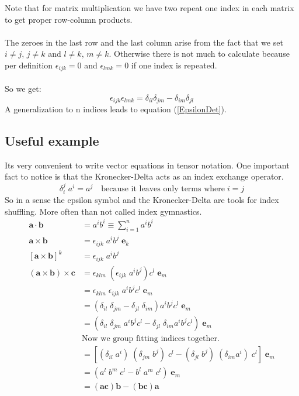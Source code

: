 \documentclass[11pt, oneside]{article}   	%
\begin{document}
Note that for matrix multiplication we have two repeat one index in each matrix to get proper 
row-column products. \\
\\
The zeroes in the last row and the last column arise from the fact that we set $i \neq j$, $j \neq k$
and $ l \neq k$, $m \neq k$. Otherwise there is not much to calculate because per definition 
$\epsilon_{ijk} = 0$ and $\epsilon_{lmk} = 0$ if one index is repeated. \\
\\
So we get:
\begin{equation}
    \epsilon_{ijk}\epsilon_{lmk} = \delta_{il} \delta_{jm} - \delta_{im} \delta_{jl}
\end{equation}
A generalization to n indices leads to equation (\ref{EpsilonDet}).
%
\subsection{Useful example}
Its very convenient to write vector equations in tensor notation. One important fact to notice
is that the Kronecker-Delta acts as an index exchange operator.
\begin{equation}
    \delta_i^j\;a^i = a^j \quad \text{because it leaves only terms where} \; i = j
\end{equation}
So in a sense the epsilon symbol and the Kronecker-Delta are tools for index shuffling.
More often than not called index gymnastics.
\begin{equation}
    \begin{aligned}
        \mathbf{a} \cdot \mathbf{b} &= a^i b^i \equiv \sum_{i=1}^n a^i b^i  \\
        \mathbf{a} \times \mathbf{b} &= \epsilon_{ijk} \; a^i b^j \; \mathbf{e}_k \\
        [\mathbf{a} \times \mathbf{b}]^k &= \epsilon_{ijk} \; a^i b^j \\
        (\mathbf{a} \times \mathbf{b}) \times \mathbf{c} &= \epsilon_{klm} \; (\epsilon_{ijk} \; a^i b^j) c^l \; \mathbf{e}_m \\
            &= \epsilon_{klm} \; \epsilon_{ijk} \; a^i b^j c^l \; \mathbf{e}_m \\
            &= (\delta_{il}\;\delta_{jm} - \delta_{jl}\;\delta_{im}) a^i b^j c^l \; \mathbf{e}_m \\
            &= (\delta_{il}\;\delta_{jm}\;a^i b^j c^l - \delta_{jl}\;\delta_{im} a^i b^j c^l) \; \mathbf{e}_m \\
            & \text{Now we group fitting indices together.} \\
            &= [(\delta_{il}\;a^i)\;(\delta_{jm}\;b^j)\;c^l - (\delta_{jl}\;b^j)\;(\delta_{im} a^i)\;c^l] \; \mathbf{e}_m \\
            &= (a^l\;b^m\;c^l - b^l\;a^m\;c^l) \; \mathbf{e}_m \\
            &= (\mathbf{a}\mathbf{c})\mathbf{b} - (\mathbf{b}\mathbf{c})\mathbf{a} \\
    \end{aligned}
\end{equation}
\end{document}
